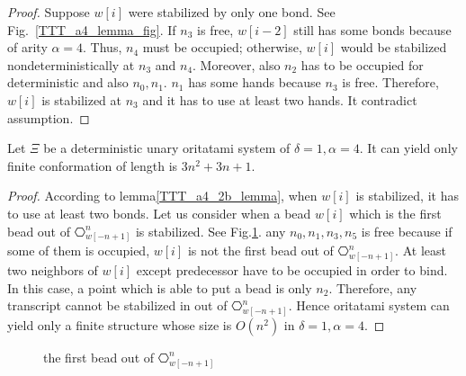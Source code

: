 \begin{proof}%
Suppose $w[i]$ were stabilized by only one bond. See Fig.~\ref{TTT_a4_lemma_fig}. If $n_3$ is free, $w[i-2]$ still has some bonds because of arity $\alpha = 4$. Thus, $n_4$ must be occupied; otherwise, $w[i]$ would be stabilized nondeterministically at $n_3$ and $n_4$. Moreover, also $n_2$ has to be occupied for deterministic and also $n_0, n_1$. $n_1$ has some hands because $n_3$ is free. Therefore, $w[i]$ is stabilized at $n_3$ and it has to use at least two hands. It contradict assumption.
\end{proof}

\begin{theorem}[$\delta = 1, \alpha = 4$]
Let $\Xi$ be a deterministic unary oritatami system of $\delta = 1, \alpha = 4$. It can yield only finite conformation of length is $3n^2  + 3n + 1$.
\end{theorem}





\begin{proof}
According to lemma\ref{TTT_a4_2b_lemma}, when $w[i]$ is stabilized, it has to use at least two bonds. Let us consider when a bead $w[i]$ which is the first bead out of $\hexagon_{w[-n+1]}^n$ is stabilized. See Fig.\ref{TTT_a4_first}. any $n_0, n_1, n_3, n_5$ is free because if some of them is occupied, $w[i]$ is not the first bead out of $\hexagon_{w[-n+1]}^n$. At least two neighbors of $w[i]$ except predecessor have to be occupied in order to bind. In this case, a point which is able to put a bead is only $n_2$. Therefore, any transcript cannot be stabilized in out of $\hexagon_{w[-n+1]}^n$. Hence oritatami system can yield only a finite structure whose size is $O(n^2)$ in $\delta =1, \alpha = 4$.
\end{proof}




\begin{figure}
 \centering
    \caption{the first bead out of $\hexagon_{w[-n+1]}^n$}
    \label{TTT_a4_first}
\end{figure}




